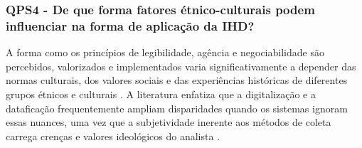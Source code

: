 \documentclass[
	12pt,				%
	oneside,			%
	a4paper,			%
	english,			%
	brazil				%
	]{abntex2ppgsi}
\begin{document}



    \subsubsection{QPS4 - De que forma fatores étnico-culturais podem influenciar na forma de aplicação da IHD?}

    A forma como os princípios de legibilidade, agência e negociabilidade são percebidos, valorizados e implementados varia significativamente a depender das normas culturais, dos valores sociais e das experiências históricas de diferentes grupos étnicos e culturais \cite{Coleti2024, Victorelli2024Adopting, durango2024data, Kurze2023, Roberts2023, Elhamdadi2022, Locoro2020, VICTORELLI2020Understanding}. A literatura enfatiza que a digitalização e a dataficação frequentemente ampliam disparidades quando os sistemas ignoram essas nuances, uma vez que a subjetividade inerente aos métodos de coleta carrega crenças e valores ideológicos do analista \cite{Refat2023, Nelson2023, Hayes2021, Briggs2021, Hornung2015}. 
\end{document}
